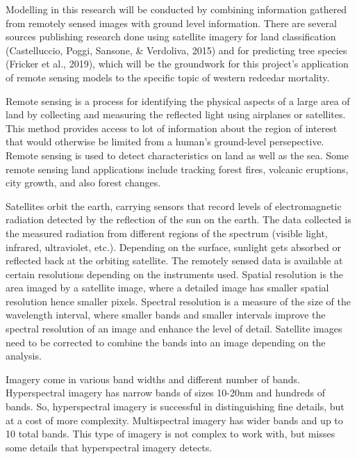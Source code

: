\documentclass[12pt,twoside]{reedthesis}
\begin{document}
Modelling in this research will be conducted by combining information gathered from remotely sensed images with ground level information. There are several sources publishing research done using satellite imagery for land classification (Castelluccio, Poggi, Sansone, \& Verdoliva, 2015) and for predicting tree species (Fricker et al., 2019), which will be the groundwork for this project's application of remote sensing models to the specific topic of western redcedar mortality.

Remote sensing is a process for identifying the physical aspects of a large area of land by collecting and measuring the reflected light using airplanes or satellites. This method provides access to lot of information about the region of interest that would otherwise be limited from a human's ground-level persepective. Remote sensing is used to detect characteristics on land as well as the sea. Some remote sensing land applications include tracking forest fires, volcanic eruptions, city growth, and also forest changes.

Satellites orbit the earth, carrying sensors that record levels of electromagnetic radiation detected by the reflection of the sun on the earth. The data collected is the measured radiation from different regions of the spectrum (visible light, infrared, ultraviolet, etc.). Depending on the surface, sunlight gets absorbed or reflected back at the orbiting satellite. The remotely sensed data is available at certain resolutions depending on the instruments used. Spatial resolution is the area imaged by a satellite image, where a detailed image has smaller spatial resolution hence smaller pixels. Spectral resolution is a measure of the size of the wavelength interval, where smaller bands and smaller intervals improve the spectral resolution of an image and enhance the level of detail. Satellite images need to be corrected to combine the bands into an image depending on the analysis.

Imagery come in various band widths and different number of bands. Hyperspectral imagery has narrow bands of sizes 10-20nm and hundreds of bands. So, hyperspectral imagery is successful in distinguishing fine details, but at a cost of more complexity. Multispectral imagery has wider bands and up to 10 total bands. This type of imagery is not complex to work with, but misses some details that hyperspectral imagery detects.
\end{document}
